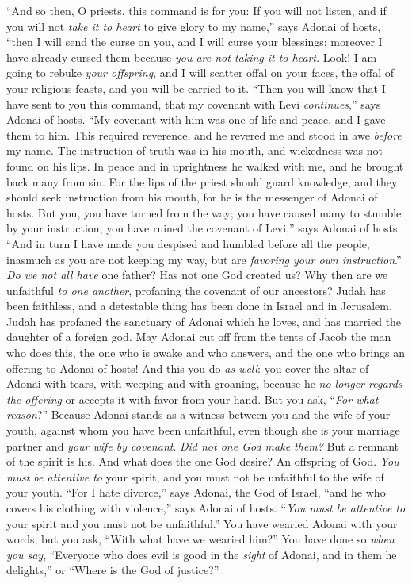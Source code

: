 \begin{biblechapter} %
\verse “And so then, O priests, this command is for you:
\verse If you will not listen, and if you will not \textit{take it to heart} to give glory to my name,” says Adonai of hosts, “then I will send the curse on you, and I will curse your blessings; moreover I have already cursed them because \textit{you are not taking it to heart}.
\verse Look! I am going to rebuke \textit{your offspring}, and I will scatter offal on your faces, the offal of your religious feasts, and you will be carried to it.
\verse “Then you will know that I have sent to you this command, that my covenant with Levi \textit{continues},” says Adonai of hosts.
\verse “My covenant with him was one of life and peace, and I gave them to him. This required reverence, and he revered me and stood in awe \textit{before} my name.
\verse The instruction of truth was in his mouth, and wickedness was not found on his lips. In peace and in uprightness he walked with me, and he brought back many from sin.
\verse For the lips of the priest should guard knowledge, and they should seek instruction from his mouth, for he is the messenger of Adonai of hosts.
\verse But you, you have turned from the way; you have caused many to stumble by your instruction; you have ruined the covenant of Levi,” says Adonai of hosts.
\verse “And in turn I have made you despised and humbled before all the people, inasmuch as you are not keeping my way, but are \textit{favoring your own instruction}.”
 \textit{Do we not all have} one father? Has not one God created us? Why then are we unfaithful \textit{to one another}, profaning the covenant of our ancestors?
\verse Judah has been faithless, and a detestable thing has been done in Israel and in Jerusalem. Judah has profaned the sanctuary of Adonai which he loves, and has married the daughter of a foreign god.
\verse May Adonai cut off from the tents of Jacob the man who does this, the one who is awake and who answers, and the one who brings an offering to Adonai of hosts!
\verse And this you do \textit{as well}: you cover the altar of Adonai with tears, with weeping and with groaning, because he \textit{no longer regards the offering} or accepts it with favor from your hand.
\verse But you ask, “\textit{For what reason}?” Because Adonai stands as a witness between you and the wife of your youth, against whom you have been unfaithful, even though she is your marriage partner and \textit{your wife by covenant}.
\verse \textit{Did not one God make them?} But a remnant of the spirit is his. And what does the one God desire? An offspring of God. \textit{You must be attentive to} your spirit, and you must not be unfaithful to the wife of your youth.
\verse “For I hate divorce,” says Adonai, the God of Israel, “and he who covers his clothing with violence,” says Adonai of hosts. “\textit{You must be attentive to} your spirit and you must not be unfaithful.”
\verse You have wearied Adonai with your words, but you ask, “With what have we wearied him?” You have done so \textit{when you say}, “Everyone who does evil is good in the \textit{sight} of Adonai, and in them he delights,” or “Where is the God of justice?”
\end{biblechapter}

